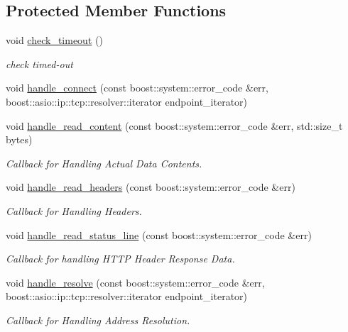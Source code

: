 \subsection*{Protected Member Functions}
\begin{DoxyCompactItemize}
\item 
void \hyperlink{classrapp_1_1cloud_1_1asio__service__http_aad88336c3d281533fad5de26a7bdc19c}{check\-\_\-timeout} ()
\begin{DoxyCompactList}\small\item\em check timed-\/out \end{DoxyCompactList}\item 
void \hyperlink{classrapp_1_1cloud_1_1asio__service__http_a0cb462a86df726f12183c0c68b6ad38c}{handle\-\_\-connect} (const boost\-::system\-::error\-\_\-code \&err, boost\-::asio\-::ip\-::tcp\-::resolver\-::iterator endpoint\-\_\-iterator)
\item 
void \hyperlink{classrapp_1_1cloud_1_1asio__service__http_a5dc1600e4bb2ba82c9be9fb209f4edfd}{handle\-\_\-read\-\_\-content} (const boost\-::system\-::error\-\_\-code \&err, std\-::size\-\_\-t bytes)
\begin{DoxyCompactList}\small\item\em Callback for Handling Actual Data Contents. \end{DoxyCompactList}\item 
void \hyperlink{classrapp_1_1cloud_1_1asio__service__http_afb9ba20beed3369b6455a20b974daa4f}{handle\-\_\-read\-\_\-headers} (const boost\-::system\-::error\-\_\-code \&err)
\begin{DoxyCompactList}\small\item\em Callback for Handling Headers. \end{DoxyCompactList}\item 
void \hyperlink{classrapp_1_1cloud_1_1asio__service__http_a72cb0683b4406a1324913f468092674b}{handle\-\_\-read\-\_\-status\-\_\-line} (const boost\-::system\-::error\-\_\-code \&err)
\begin{DoxyCompactList}\small\item\em Callback for handling H\-T\-T\-P Header Response Data. \end{DoxyCompactList}\item 
void \hyperlink{classrapp_1_1cloud_1_1asio__service__http_afc10f3f69b8869f2ba3f27a5591df038}{handle\-\_\-resolve} (const boost\-::system\-::error\-\_\-code \&err, boost\-::asio\-::ip\-::tcp\-::resolver\-::iterator endpoint\-\_\-iterator)
\begin{DoxyCompactList}\small\item\em Callback for Handling Address Resolution. \end{DoxyCompactList}\item 

\end{DoxyCompactItemize}
